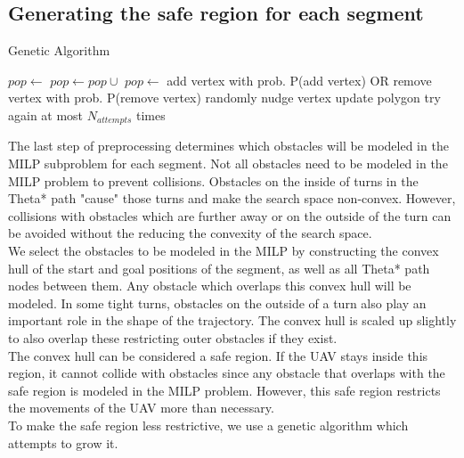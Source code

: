 \subsection{Generating the safe region for each segment}
\begin{algorithm}
\caption{Genetic Algorithm}
\label{alg:ga}
\begin{algorithmic}[1]
\State $pop \leftarrow $ 
\State $pop \leftarrow pop \cup $ 
\State {}
\State $pop \leftarrow $ 
\EndFor
\Return {}
\EndFunction
{}
\State add vertex with prob. P(add vertex)
\State OR remove vertex with prob. P(remove vertex)
\State randomly nudge  vertex
\State update polygon
\Else
\State try again at most $N_{attempts}$ times
\EndIf
\EndFor
\EndFor
\Return {}
\EndFunction
\end{algorithmic}
\end{algorithm}
The last step of preprocessing determines which obstacles will be modeled in the MILP subproblem for each segment. Not all obstacles need to be modeled in the MILP problem to prevent collisions. Obstacles on the inside of turns in the Theta* path "cause" those turns and make the search space non-convex. However, collisions with obstacles which are further away or on the outside of the turn can be avoided without the reducing the convexity of the search space. \\
We select the obstacles to be modeled in the MILP by constructing the convex hull of the start and goal positions of the segment, as well as all Theta* path nodes between them. Any obstacle which overlaps this convex hull will be modeled. In some tight turns, obstacles on the outside of a turn also play an important role in the shape of the trajectory. The convex hull is scaled up slightly to also overlap these restricting outer obstacles if they exist. \\
The convex hull can be considered a safe region. If the UAV stays inside this region, it cannot collide with obstacles since any obstacle that overlaps with the safe region is modeled in the MILP problem. However, this safe region restricts the movements of the UAV more than necessary. \\
To make the safe region less restrictive, we use a genetic algorithm which attempts to grow it.
